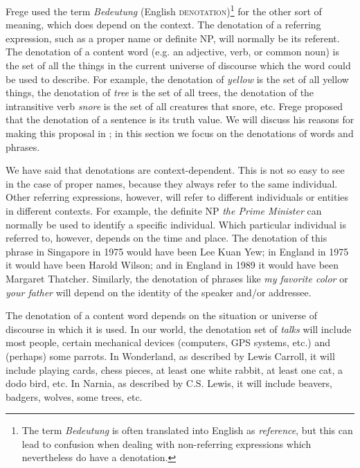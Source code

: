 Frege used the term \textit{Bedeutung} (English \textsc{denotation})\footnote{The term \textit{Bedeutung} is often translated into English as \textit{reference}, but this can lead to confusion when dealing with non-referring expressions which nevertheless do have a denotation.} for the other sort of meaning, which does depend on the context. The denotation of a referring expression, such as a proper name or definite NP, will normally be its referent. The denotation of a content word (e.g. an adjective, verb, or common noun) is the set of all the things in the current universe of discourse which the word could be used to describe. For example, the denotation of \textit{yellow} is the set of all yellow things, the denotation of \textit{tree} is the set of all trees, the denotation of the intransitive verb \textit{snore} is the set of all creatures that snore, etc. Frege proposed that the denotation of a sentence is its truth value. We will discuss his reasons for making this proposal in ; in this section we focus on the denotations of words and phrases.



We have said that denotations are context-dependent. This is not so easy to see in the case of proper names, because they always refer to the same individual. Other referring expressions, however, will refer to different individuals or entities in different contexts. For example, the definite NP \textit{the Prime Minister} can normally be used to identify a specific individual. Which particular individual is referred to, however, depends on the time and place. The denotation of this phrase in Singapore in 1975 would have been Lee Kuan Yew; in England in 1975 it would have been Harold Wilson; and in England in 1989 it would have been Margaret Thatcher. Similarly, the denotation of phrases like \textit{my favorite color} or \textit{your father} will depend on the identity of the speaker and/or addressee.



The denotation of a content word depends on the situation or universe of discourse in which it is used. In our world, the denotation set of \textit{talks} will include most people, certain mechanical devices (computers, GPS systems, etc.) and (perhaps) some parrots. In Wonderland, as described by Lewis Carroll, it will include playing cards, chess pieces, at least one white rabbit, at least one cat, a dodo bird, etc. In Narnia, as described by C.S. Lewis, it will include beavers, badgers, wolves, some trees, etc.



